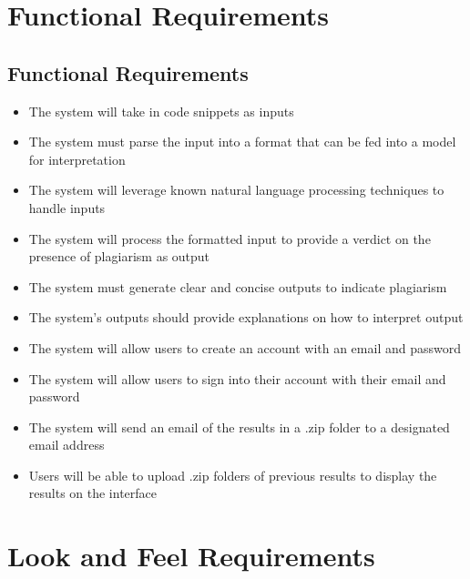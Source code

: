\documentclass[12pt]{article}
\begin{document}
\section{Functional Requirements}
\subsection{Functional Requirements}
\begin{itemize}
    \item The system will take in code snippets as inputs
    \item The system must parse the input into a format that can be fed into a model for interpretation
    \item The system will leverage known natural language processing techniques to handle inputs
    \item The system will process the formatted input to provide a verdict on the presence of plagiarism as output
    \item The system must generate clear and concise outputs to indicate plagiarism
    \item The system's outputs should provide explanations on how to interpret output
    \item The system will allow users to create an account with an email and password
    \item The system will allow users to sign into their account with their email and password
    \item The system will send an email of the results in a .zip folder to a designated email address
    \item Users will be able to upload .zip folders of previous results to display the results on the interface
\end{itemize}

\section{Look and Feel Requirements}
\end{document}
